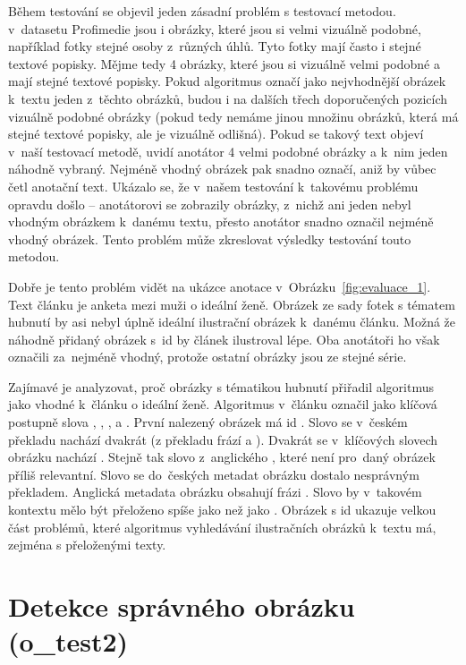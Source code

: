 Během testování se objevil jeden zásadní problém s testovací metodou. v~datasetu Profimedie jsou i obrázky, které jsou si velmi vizuálně podobné, například fotky stejné osoby z~různých úhlů. Tyto fotky mají často i stejné textové popisky. Mějme tedy 4 obrázky, které jsou si vizuálně velmi podobné a mají stejné textové popisky. Pokud algoritmus označí jako nejvhodnější obrázek k~textu jeden z~těchto obrázků, budou i na dalších třech doporučených pozicích vizuálně podobné obrázky (pokud tedy nemáme jinou množinu obrázků, která má stejné textové popisky, ale je vizuálně odlišná). Pokud se takový text objeví v~naší testovací metodě, uvidí anotátor 4 velmi podobné obrázky a k~nim jeden náhodně vybraný. Nejméně vhodný obrázek pak snadno označí, aniž by vůbec četl anotační text. Ukázalo se, že v~našem testování k~takovému problému opravdu došlo -- anotátorovi se zobrazily obrázky, z~nichž ani jeden nebyl vhodným obrázkem k~danému textu, přesto anotátor snadno označil nejméně vhodný obrázek. Tento problém může zkreslovat výsledky testování touto metodou.

Dobře je tento problém vidět na ukázce anotace v~Obrázku~\ref{fig:evaluace_1}. Text článku je anketa mezi muži o ideální ženě. Obrázek ze sady fotek s tématem hubnutí by asi nebyl úplně ideální ilustrační obrázek k~danému článku. Možná že náhodně přidaný obrázek s~id  by článek ilustroval lépe. Oba anotátoři ho však označili za~nejméně vhodný, protože ostatní obrázky jsou ze stejné série.

Zajímavé je analyzovat, proč obrázky s tématikou hubnutí přiřadil algoritmus jako vhodné k~článku o ideální ženě. Algoritmus v~článku označil jako klíčová postupně slova , , ,  a . První nalezený obrázek má id . Slovo  se v~českém překladu nachází dvakrát (z překladu frází  a ). Dvakrát se v~klíčových slovech obrázku nachází . Stejně tak slovo  z~anglického , které není pro~daný obrázek příliš relevantní. Slovo  se do~českých metadat obrázku dostalo nesprávným překladem. Anglická metadata obrázku obsahují frázi . Slovo  by v~takovém kontextu mělo být přeloženo spíše jako  než jako . Obrázek s id  ukazuje velkou část problémů, které algoritmus vyhledávání ilustračních obrázků k~textu má, zejména s přeloženými texty.


\section{Detekce správného obrázku (o\_test2)}

